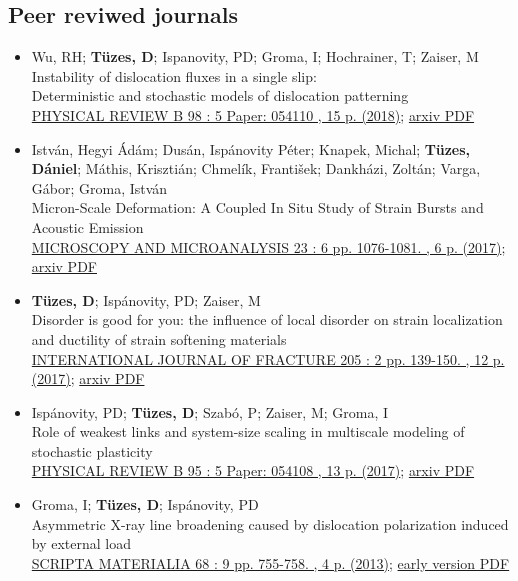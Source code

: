 \documentclass[11pt,a4paper,sans]{moderncv}        %
\begin{document}
\subsection{Peer reviwed journals}
\begin{itemize}
\item Wu, RH; \textbf{Tüzes, D}; Ispanovity, PD; Groma, I; Hochrainer, T; Zaiser, M\\
	Instability of dislocation fluxes in a single slip:\\
	Deterministic and stochastic models of dislocation patterning\\
    \href{https://journals.aps.org/prb/abstract/10.1103/PhysRevB.98.054110}{PHYSICAL REVIEW B 98 : 5 Paper: 054110 , 15 p. (2018)};
    \href{https://arxiv.org/pdf/1708.05533}{arxiv PDF}
\item István, Hegyi Ádám; Dusán, Ispánovity Péter; Knapek, Michal; \textbf{Tüzes, Dániel}; Máthis, Krisztián; Chmelík, František; Dankházi, Zoltán; Varga, Gábor; Groma, István\\
    Micron-Scale Deformation: A Coupled In Situ Study of Strain Bursts and Acoustic Emission\\
    \href{https://www.cambridge.org/core/journals/microscopy-and-microanalysis/article/micronscale-deformation-a-coupled-in-situ-study-of-strain-bursts-and-acoustic-emission/DAF84F7E4CC7C2A211E39A1FFBCCB2D0}{MICROSCOPY AND MICROANALYSIS 23 : 6 pp. 1076-1081. , 6 p. (2017)};
    \href{https://arxiv.org/pdf/1604.01815}{arxiv PDF}
\item \textbf{Tüzes, D}; Ispánovity, PD; Zaiser, M\\
    Disorder is good for you: the influence of local disorder on strain localization and ductility of strain softening materials\\
    \href{https://link.springer.com/article/10.1007\%2Fs10704-017-0187-1}{INTERNATIONAL JOURNAL OF FRACTURE 205 : 2 pp. 139-150. , 12 p. (2017)};
    \href{https://arxiv.org/pdf/1604.01821}{arxiv PDF}
\item Ispánovity, PD; \textbf{Tüzes, D}; Szabó, P; Zaiser, M; Groma, I\\
    Role of weakest links and system-size scaling in multiscale modeling of stochastic plasticity\\
    \href{https://journals.aps.org/prb/abstract/10.1103/PhysRevB.95.054108}{PHYSICAL REVIEW B 95 : 5 Paper: 054108 , 13 p. (2017)};
    \href{https://arxiv.org/pdf/1604.01645}{arxiv PDF}
\item Groma, I; \textbf{Tüzes, D}; Ispánovity, PD\\
    Asymmetric X-ray line broadening caused by dislocation polarization induced by external load\\
    \href{https://www.sciencedirect.com/science/article/pii/S1359646213000110}{SCRIPTA MATERIALIA 68 : 9 pp. 755-758. , 4 p. (2013)}; \href{http://metal.elte.hu/~tuzes/docs/pre\%20AsymmetricX-ray\%20line\%20broadening\%20caused\%20by\%20dislocation\%20polarization\%20induced\%20by\%20external\%20load.pdf}{early version PDF}
\end{itemize}
    
\end{document}

